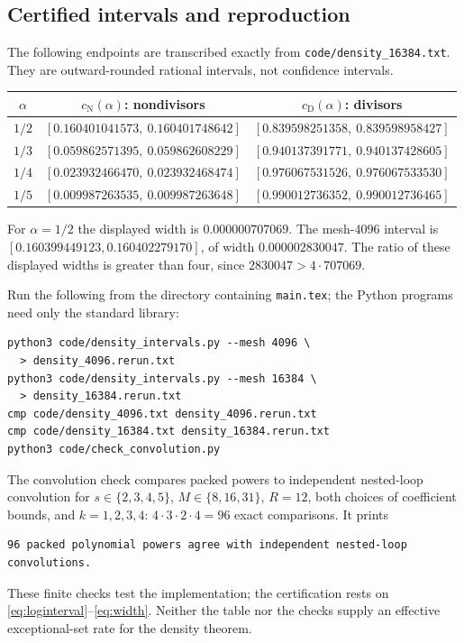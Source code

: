 \documentclass[10pt]{article}
\theoremstyle{remark}
\newcommand{\cn}{c_{\mathrm N}}
\newcommand{\cd}{c_{\mathrm D}}
\begin{document}
\subsection{Certified intervals and reproduction}\label{subsec:table}
The following endpoints are transcribed exactly from
\texttt{code/density\_16384.txt}. They are outward-rounded rational
intervals, not confidence intervals.
\begin{center}
\small
\begin{tabular}{c|c|c}
$\alpha$ & $\cn(\alpha)$: nondivisors & $\cd(\alpha)$: divisors\\ \hline
$1/2$ & $[0.160401041573,\ 0.160401748642]$
      & $[0.839598251358,\ 0.839598958427]$\\
$1/3$ & $[0.059862571395,\ 0.059862608229]$
      & $[0.940137391771,\ 0.940137428605]$\\
$1/4$ & $[0.023932466470,\ 0.023932468474]$
      & $[0.976067531526,\ 0.976067533530]$\\
$1/5$ & $[0.009987263535,\ 0.009987263648]$
      & $[0.990012736352,\ 0.990012736465]$
\end{tabular}
\end{center}
For $\alpha=1/2$ the displayed width is $0.000000707069$.
The mesh-$4096$ interval is $[0.160399449123,0.160402279170]$,
of width $0.000002830047$. The ratio of these displayed widths is
greater than four, since $2830047>4\cdot707069$.

Run the following from the directory containing \texttt{main.tex};
the Python programs need only the standard library:
\begingroup\footnotesize
\begin{verbatim}
python3 code/density_intervals.py --mesh 4096 \
  > density_4096.rerun.txt
python3 code/density_intervals.py --mesh 16384 \
  > density_16384.rerun.txt
cmp code/density_4096.txt density_4096.rerun.txt
cmp code/density_16384.txt density_16384.rerun.txt
python3 code/check_convolution.py
\end{verbatim}
\endgroup
The convolution check compares packed powers to independent
nested-loop convolution for $s\in\{2,3,4,5\}$, $M\in\{8,16,31\}$,
$R=12$, both choices of coefficient bounds, and $k=1,2,3,4$:
$4\cdot3\cdot2\cdot4=96$ exact comparisons. It prints
\begingroup\footnotesize
\begin{verbatim}
96 packed polynomial powers agree with independent nested-loop convolutions.
\end{verbatim}
\endgroup
These finite checks test the implementation; the certification rests on
\eqref{eq:loginterval}--\eqref{eq:width}. Neither the table nor the
checks supply an effective exceptional-set rate for the density theorem.
\end{document}
